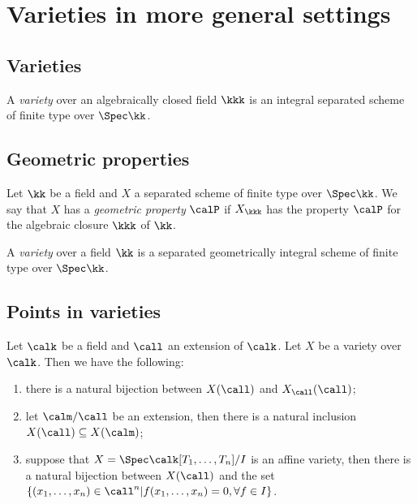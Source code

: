 \section{Varieties in more general settings}
\subsection{Varieties}

    \begin{definition}\label{def:variety_over_algebraically_closed_field}
        A \emph{variety} over an algebraically closed field \(\kkk\) is an integral separated scheme of finite type over \(\Spec \kk\).
    \end{definition}



\subsection{Geometric properties}

    \begin{definition}\label{def:geometrically_property}
        Let \(\kk\) be a field and \(X\) a separated scheme of finite type over \(\Spec \kk\).
        We say that \(X\) has a \emph{geometric property} \(\calP\) if \(X_{\kkk}\) has the property \(\calP\) for the algebraic closure \(\kkk\) of \(\kk\).
    \end{definition}

    \begin{definition}\label{def:varieties_over_general_field}
        A \emph{variety} over a field \(\kk\) is a separated geometrically integral scheme of finite type over \(\Spec \kk\).
    \end{definition}


\subsection{Points in varieties}

    \begin{proposition}\label{prop:points_in_varieties_and_extension_of_base_field}
        Let \(\calk\) be a field and \(\call\) an extension of \(\calk\).
        Let \(X\) be a variety over \(\calk\).
        Then we have the following:
        \begin{enumerate}
            \item there is a natural bijection between \(X(\call)\) and \(X_\call(\call)\);
            \item let \(\calm/\call\) be an extension, then there is a natural inclusion \(X(\call) \subseteq X(\calm)\);
            \item suppose that \(X = \Spec \calk[T_1,\ldots,T_n]/I\) is an affine variety, then there is a natural bijection between \(X(\call)\) and the set \(\{(x_1,\ldots,x_n) \in \call^n | f(x_1,\ldots,x_n) = 0, \forall f \in I\}\).
        \end{enumerate}
    \end{proposition}